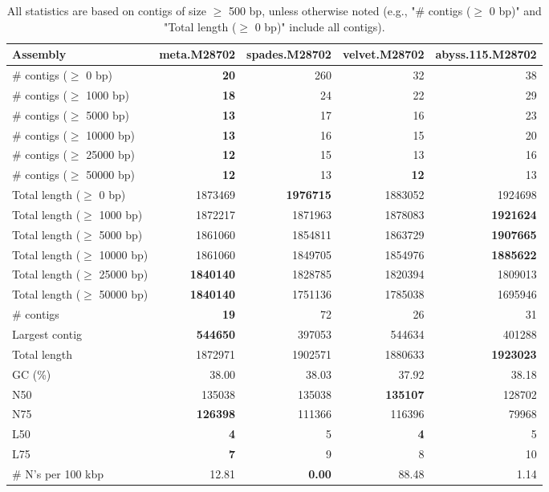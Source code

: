 \documentclass[12pt,a4paper]{article}
\begin{document}
\begin{table}[ht]
\begin{center}
\caption{All statistics are based on contigs of size $\geq$ 500 bp, unless otherwise noted (e.g., "\# contigs ($\geq$ 0 bp)" and "Total length ($\geq$ 0 bp)" include all contigs).}
\begin{tabular}{|l*{4}{|r}|}
\hline
Assembly & meta.M28702 & spades.M28702 & velvet.M28702 & abyss.115.M28702 \\ \hline
\# contigs ($\geq$ 0 bp) & {\bf 20} & 260 & 32 & 38 \\ \hline
\# contigs ($\geq$ 1000 bp) & {\bf 18} & 24 & 22 & 29 \\ \hline
\# contigs ($\geq$ 5000 bp) & {\bf 13} & 17 & 16 & 23 \\ \hline
\# contigs ($\geq$ 10000 bp) & {\bf 13} & 16 & 15 & 20 \\ \hline
\# contigs ($\geq$ 25000 bp) & {\bf 12} & 15 & 13 & 16 \\ \hline
\# contigs ($\geq$ 50000 bp) & {\bf 12} & 13 & {\bf 12} & 13 \\ \hline
Total length ($\geq$ 0 bp) & 1873469 & {\bf 1976715} & 1883052 & 1924698 \\ \hline
Total length ($\geq$ 1000 bp) & 1872217 & 1871963 & 1878083 & {\bf 1921624} \\ \hline
Total length ($\geq$ 5000 bp) & 1861060 & 1854811 & 1863729 & {\bf 1907665} \\ \hline
Total length ($\geq$ 10000 bp) & 1861060 & 1849705 & 1854976 & {\bf 1885622} \\ \hline
Total length ($\geq$ 25000 bp) & {\bf 1840140} & 1828785 & 1820394 & 1809013 \\ \hline
Total length ($\geq$ 50000 bp) & {\bf 1840140} & 1751136 & 1785038 & 1695946 \\ \hline
\# contigs & {\bf 19} & 72 & 26 & 31 \\ \hline
Largest contig & {\bf 544650} & 397053 & 544634 & 401288 \\ \hline
Total length & 1872971 & 1902571 & 1880633 & {\bf 1923023} \\ \hline
GC (\%) & 38.00 & 38.03 & 37.92 & 38.18 \\ \hline
N50 & 135038 & 135038 & {\bf 135107} & 128702 \\ \hline
N75 & {\bf 126398} & 111366 & 116396 & 79968 \\ \hline
L50 & {\bf 4} & 5 & {\bf 4} & 5 \\ \hline
L75 & {\bf 7} & 9 & 8 & 10 \\ \hline
\# N's per 100 kbp & 12.81 & {\bf 0.00} & 88.48 & 1.14 \\ \hline
\end{tabular}
\end{center}
\end{table}
\end{document}
